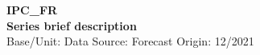 \documentclass[a4paper,10pt]{article}
\begin{document}
\thispagestyle{empty}
\begin{landscape}
\begin{center}

\textbf{IPC_FR} \\ 

\textbf{Series brief description} \\ 

Base/Unit: 
\space \space \space Data Source:  
\space \space \space Forecast Origin: 12/2021 \\ 
\end{center}

\begin{footnotesize} \singlespacing  \end{footnotesize} 

\end{landscape}
\end{document}
